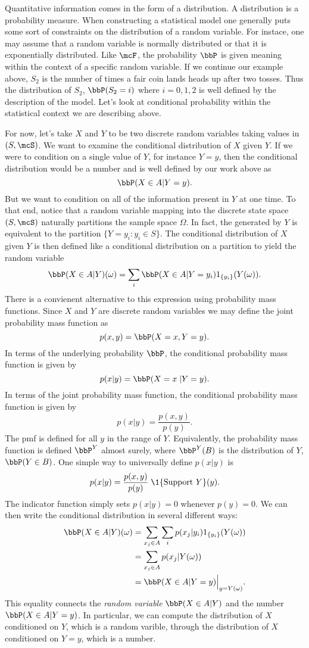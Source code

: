 \documentclass{report}
\begin{document}
Quantitative information comes in the form of a distribution.  A distribution is a probability measure.  When constructing a statistical model one generally puts some sort of constraints on the distribution of a random variable.  For instace, one may assume that a random variable is normally distributed or that it is exponentially distributed.  Like $\mcF$, the probability $\bbP$ is given meaning within the context of a specific random variable.  If we continue our example above, $S_2$ is the number of times a fair coin lands heads up after two tosses.  Thus the distribution of $S_2$, $\bbP(S_2 = i)$ where $i=0,1,2$ is well defined by the description of the model.  Let's look at conditional probability within the statistical context we are describing above.

For now, let's take $X$ and $Y$ to be two discrete random variables taking values in $(S,\mcS)$.  We want to examine the conditional distribution of $X$ given $Y$.  If we were to condition on a single value of $Y$, for instance $Y = y$, then the conditional distribution would be a number and is well defined by our work above as
\[
\bbP(X \in A | Y = y).
\]
But we want to condition on all of the information present in $Y$ at one time.  To that end, notice that a random variable mapping into the discrete state space $(S,\mcS)$ naturally partitions the sample space $\Omega$.  In fact, the \sigalg generated by $Y$  is equivalent to the partition $\{ Y = y_i : y_i \in S\}$.  The conditional distribution of $X$ given $Y$ is then defined like a conditional distribution on a partition to yield the random variable
\[
\bbP(X \in A | Y)(\omega) = \sum_i \bbP(X \in A | Y = y_i) 1_{\{y_i\}}(Y(\omega)).
\]
There is a convienent alternative to this expression using probability mass functions.  Since $X$ and $Y$ are discrete random variables we may define the joint probability mass function as
\[
p(x,y) = \bbP(X = x, Y = y).
\]
In terms of the underlying probability $\bbP$, the conditional probability mass function is given by
\[
p(x|y) = \bbP(X = x \; | Y = y).
\]
In terms of the joint probability mass function, the conditional probability mass function is given by
\[
p(x|y) = \frac{p(x,y)}{p(y)}.
\]
The pmf is defined for all $y$ in the range of $Y$.  Equivalently, the probability mass function is defined $\bbP^Y$ almost surely, where $\bbP^Y(B)$ is the distribution of $Y$, $\bbP(Y \in B)$.  One simple way to universally define $p(x|y)$ is 
\[
p(x|y) = \frac{p(x,y)}{p(y)} \; \1 {\{\textmd{Support } Y \}}(y).
\]
The indicator function simply sets $p(x|y) = 0$ whenever $p(y)=0$.
We can then write the conditional distribution in several different ways:
\begin{align*}
\bbP(X \in A | Y)(\omega) & = \sum_{x_j \in A} \sum_i p(x_j | y_i) 1_{\{y_i\}}(Y(\omega)) \\
& = \sum_{x_j \in A} p(x_j | Y(\omega)) \\
& = \bbP(X \in A | Y = y) \Big|_{y = Y(\omega)}.
\end{align*}
This equality connects the \emph{random variable} $\bbP(X \in A | Y)$ and the number $\bbP(X \in A | Y = y)$.  In particular, we can compute the distribution of $X$ conditioned on $Y$, which is a random varible, through the distribution of $X$ conditioned on $Y = y$, which is a number.
\end{document}
